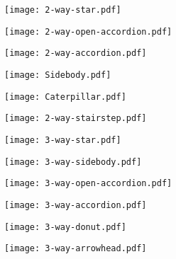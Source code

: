 \begin{Figure}\centering\texttt{[image: 2-way-star.pdf]}\end{Figure} \begin{Figure}\centering\texttt{[image: 2-way-open-accordion.pdf]}\end{Figure} \begin{Figure}\centering\texttt{[image: 2-way-accordion.pdf]}\end{Figure} \begin{Figure}\centering\texttt{[image: Sidebody.pdf]}\end{Figure} \begin{Figure}\centering\texttt{[image: Caterpillar.pdf]}\end{Figure} \begin{Figure}\centering\texttt{[image: 2-way-stairstep.pdf]}\end{Figure} 


\begin{Figure}\centering\texttt{[image: 3-way-star.pdf]}\end{Figure} \begin{Figure}\centering\texttt{[image: 3-way-sidebody.pdf]}\end{Figure} \begin{Figure}\centering\texttt{[image: 3-way-open-accordion.pdf]}\end{Figure} \begin{Figure}\centering\texttt{[image: 3-way-accordion.pdf]}\end{Figure} \begin{Figure}\centering\texttt{[image: 3-way-donut.pdf]}\end{Figure} \begin{Figure}\centering\texttt{[image: 3-way-arrowhead.pdf]}\end{Figure} 

